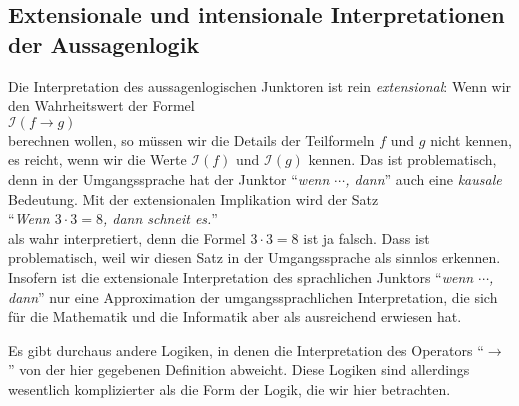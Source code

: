 \subsection{Extensionale und intensionale Interpretationen der Aussagenlogik}
Die Interpretation des aussagenlogischen Junktoren ist rein \emph{extensional}:
Wenn wir den Wahrheitswert der Formel
\\[0.2cm]
\hspace*{1.3cm}
$\mathcal{I}(f \rightarrow g)$ 
\\[0.2cm]
berechnen wollen, so m\"{u}ssen wir die Details der Teilformeln $f$ und $g$ nicht kennen, es reicht,
wenn wir die Werte $\mathcal{I}(f)$ und $\mathcal{I}(g)$ kennen.   Das ist problematisch,
denn in der Umgangssprache hat der Junktor
``\textsl{wenn $\cdots$, dann}'' auch eine \emph{kausale} Bedeutung.  Mit der extensionalen
Implikation wird der Satz
\\[0.2cm]
\hspace*{1.3cm}
``\textsl{Wenn $3 \cdot 3 = 8$, dann schneit es.}''
\\[0.2cm]
als wahr interpretiert, denn die Formel $3 \cdot 3 = 8$ ist ja falsch.  Dass ist problematisch, weil wir diesen Satz in der Umgangssprache 
als sinnlos erkennen.  Insofern ist die extensionale Interpretation des sprachlichen Junktors
``\textsl{wenn $\cdots$, dann}'' nur eine Approximation der umgangssprachlichen Interpretation, die sich f\"{u}r die
Mathematik und die Informatik aber als ausreichend erwiesen hat.

Es gibt durchaus andere Logiken, in denen die Interpretation des Operators ``$\rightarrow$'' von der
hier gegebenen Definition abweicht.  Diese Logiken sind allerdings wesentlich komplizierter als die
Form der Logik, die wir hier betrachten.

